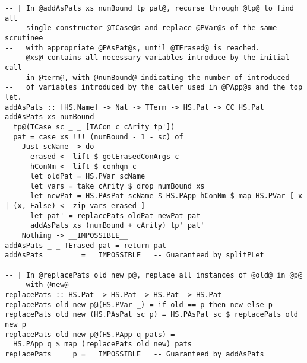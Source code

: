 \begin{lstlisting}
-- | In @addAsPats xs numBound tp pat@, recurse through @tp@ to find all
--   single constructor @TCase@s and replace @PVar@s of the same scrutinee
--   with appropriate @PAsPat@s, until @TErased@ is reached.
--   @xs@ contains all necessary variables introduce by the initial call
--   in @term@, with @numBound@ indicating the number of introduced
--   of variables introduced by the caller used in @PApp@s and the top let.
addAsPats :: [HS.Name] -> Nat -> TTerm -> HS.Pat -> CC HS.Pat
addAsPats xs numBound
  tp@(TCase sc _ _ [TACon c cArity tp'])
  pat = case xs !!! (numBound - 1 - sc) of
    Just scName -> do
      erased <- lift $ getErasedConArgs c
      hConNm <- lift $ conhqn c
      let oldPat = HS.PVar scName
      let vars = take cArity $ drop numBound xs
      let newPat = HS.PAsPat scName $ HS.PApp hConNm $ map HS.PVar [ x | (x, False) <- zip vars erased ]
      let pat' = replacePats oldPat newPat pat
      addAsPats xs (numBound + cArity) tp' pat'
    Nothing -> __IMPOSSIBLE__
addAsPats _ _ TErased pat = return pat
addAsPats _ _ _ _ = __IMPOSSIBLE__ -- Guaranteed by splitPLet

-- | In @replacePats old new p@, replace all instances of @old@ in @p@
--   with @new@
replacePats :: HS.Pat -> HS.Pat -> HS.Pat -> HS.Pat
replacePats old new p@(HS.PVar _) = if old == p then new else p
replacePats old new (HS.PAsPat sc p) = HS.PAsPat sc $ replacePats old new p
replacePats old new p@(HS.PApp q pats) =
  HS.PApp q $ map (replacePats old new) pats
replacePats _ _ p = __IMPOSSIBLE__ -- Guaranteed by addAsPats
\end{lstlisting}